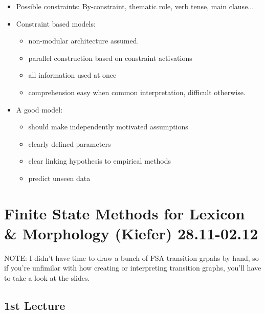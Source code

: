 \documentclass[11pt]{article}
\newenvironment{itemise}{
\begin{itemize}
  \setlength{\itemsep}{1pt}
  \setlength{\parskip}{0pt}
  \setlength{\parsep}{0pt}
}{\end{itemize}}
\begin{document}
\begin{itemise}
\begin{itemise}
\begin{itemise}
 \item 2. Input {\bf determines} the probabilistic activation for each constraint.
 \item 3. {\bf Weigh} constraints according to strength.
 \item 4. Alternatives {\bf compete}.
 \item 5. {\bf Map} cycles to reading time.  
 \end{itemise}
 \item Possible constraints: By-constraint, thematic role, verb tense, main clause...
 \item Constraint based models:
 \begin{itemise}
 \item non-modular architecture assumed.
 \item parallel construction based on constraint activations
 \item all information used at once
 \item comprehension easy when common interpretation, difficult otherwise.
 \end{itemise}
 \item A good model:
 \begin{itemise}
 \item should make independently motivated assumptions
 \item clearly defined parameters
 \item clear linking hypothesis to empirical methods
 \item predict unseen data
 \end{itemise}
\end{itemise}
\end{itemise}

\section{Finite State Methods for Lexicon \& Morphology (Kiefer) 28.11-02.12}
NOTE: I didn't have time to draw a bunch of FSA transition grpahs by hand, so if you're unfimilar with how creating or interpreting transition graphs, you'll have to take a look at the slides.

\subsection{ 1st Lecture }
\end{document}
